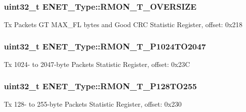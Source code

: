 \subsubsection[{\texorpdfstring{R\+M\+O\+N\+\_\+\+T\+\_\+\+O\+V\+E\+R\+S\+I\+ZE}{RMON_T_OVERSIZE}}]{ uint32\+\_\+t E\+N\+E\+T\+\_\+\+Type\+::\+R\+M\+O\+N\+\_\+\+T\+\_\+\+O\+V\+E\+R\+S\+I\+ZE}\hypertarget{structENET__Type_a365ff493cae68cd4ebcc047ef1fc6728}{}\label{structENET__Type_a365ff493cae68cd4ebcc047ef1fc6728}
Tx Packets GT M\+A\+X\+\_\+\+FL bytes and Good C\+RC Statistic Register, offset\+: 0x218 
\subsubsection[{\texorpdfstring{R\+M\+O\+N\+\_\+\+T\+\_\+\+P1024\+T\+O2047}{RMON_T_P1024TO2047}}]{ uint32\+\_\+t E\+N\+E\+T\+\_\+\+Type\+::\+R\+M\+O\+N\+\_\+\+T\+\_\+\+P1024\+T\+O2047}\hypertarget{structENET__Type_a95db7c1c48c2b05c1d0cc7e838fcd301}{}\label{structENET__Type_a95db7c1c48c2b05c1d0cc7e838fcd301}
Tx 1024-\/ to 2047-\/byte Packets Statistic Register, offset\+: 0x23C 
\subsubsection[{\texorpdfstring{R\+M\+O\+N\+\_\+\+T\+\_\+\+P128\+T\+O255}{RMON_T_P128TO255}}]{ uint32\+\_\+t E\+N\+E\+T\+\_\+\+Type\+::\+R\+M\+O\+N\+\_\+\+T\+\_\+\+P128\+T\+O255}\hypertarget{structENET__Type_a69cc3fc0f4dd2c25058ad3647694e59a}{}\label{structENET__Type_a69cc3fc0f4dd2c25058ad3647694e59a}
Tx 128-\/ to 255-\/byte Packets Statistic Register, offset\+: 0x230 
